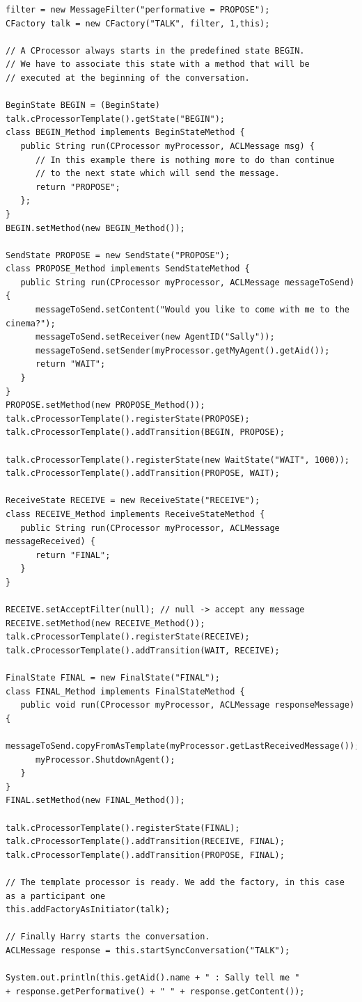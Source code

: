 \begin{lstlisting}[style=Java]
filter = new MessageFilter("performative = PROPOSE");
CFactory talk = new CFactory("TALK", filter, 1,this);

// A CProcessor always starts in the predefined state BEGIN.
// We have to associate this state with a method that will be
// executed at the beginning of the conversation.

BeginState BEGIN = (BeginState) talk.cProcessorTemplate().getState("BEGIN");
class BEGIN_Method implements BeginStateMethod {
   public String run(CProcessor myProcessor, ACLMessage msg) {
      // In this example there is nothing more to do than continue
      // to the next state which will send the message.
      return "PROPOSE";
   };
}
BEGIN.setMethod(new BEGIN_Method());

SendState PROPOSE = new SendState("PROPOSE");
class PROPOSE_Method implements SendStateMethod {
   public String run(CProcessor myProcessor, ACLMessage messageToSend) {
      messageToSend.setContent("Would you like to come with me to the cinema?");
      messageToSend.setReceiver(new AgentID("Sally"));
      messageToSend.setSender(myProcessor.getMyAgent().getAid());
      return "WAIT";
   }
}
PROPOSE.setMethod(new PROPOSE_Method());
talk.cProcessorTemplate().registerState(PROPOSE);
talk.cProcessorTemplate().addTransition(BEGIN, PROPOSE);

talk.cProcessorTemplate().registerState(new WaitState("WAIT", 1000));
talk.cProcessorTemplate().addTransition(PROPOSE, WAIT);

ReceiveState RECEIVE = new ReceiveState("RECEIVE");
class RECEIVE_Method implements ReceiveStateMethod {
   public String run(CProcessor myProcessor, ACLMessage messageReceived) {
      return "FINAL";
   }
}

RECEIVE.setAcceptFilter(null); // null -> accept any message
RECEIVE.setMethod(new RECEIVE_Method());
talk.cProcessorTemplate().registerState(RECEIVE);
talk.cProcessorTemplate().addTransition(WAIT, RECEIVE);

FinalState FINAL = new FinalState("FINAL");
class FINAL_Method implements FinalStateMethod {
   public void run(CProcessor myProcessor, ACLMessage responseMessage) {
      messageToSend.copyFromAsTemplate(myProcessor.getLastReceivedMessage());
      myProcessor.ShutdownAgent();
   }
}
FINAL.setMethod(new FINAL_Method());

talk.cProcessorTemplate().registerState(FINAL);
talk.cProcessorTemplate().addTransition(RECEIVE, FINAL);
talk.cProcessorTemplate().addTransition(PROPOSE, FINAL);

// The template processor is ready. We add the factory, in this case as a participant one
this.addFactoryAsInitiator(talk);

// Finally Harry starts the conversation.
ACLMessage response = this.startSyncConversation("TALK");

System.out.println(this.getAid().name + " : Sally tell me "
+ response.getPerformative() + " " + response.getContent());
\end{lstlisting}

